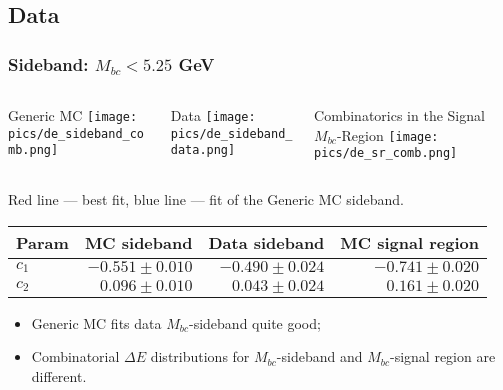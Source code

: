 \documentclass[10 pt,compress,mathserif]{beamer}
\begin{document}
\subsection{Data}
\begin{frame}
 \frametitle{Sideband: $M_{bc}<5.25$ GeV}
 \begin{tiny}
 \begin{columns}
  \begin{column}{0.33\textwidth}
  \begin{center}
  Generic MC
   \texttt{[image: pics/de\_sideband\_comb.png]}
   \end{center}
  \end{column}
  \begin{column}{0.33\textwidth}
  \begin{center}
  Data
   \texttt{[image: pics/de\_sideband\_data.png]}
   \end{center}
  \end{column}
  \begin{column}{0.33\textwidth}
  \begin{center}
  Combinatorics in the Signal $M_{bc}$-Region
   \texttt{[image: pics/de\_sr\_comb.png]}
   \end{center}
  \end{column}
 \end{columns}
 \begin{center}
  Red line --- best fit, blue line --- fit of the Generic MC sideband.
 \end{center}
\end{tiny}

\begin{small}
 \begin{table}[bt]
 \small
 \begin{tabular}{|l|r|r|r|} \hline
 Param &    MC sideband    & Data sideband & MC signal region \\ \hline
$c_1$  &$-0.551 \pm 0.010$ & $-0.490 \pm 0.024$ &$-0.741 \pm 0.020$ \\ \hline
$c_2$  &$ 0.096 \pm 0.010$ & $ 0.043 \pm 0.024$ &$ 0.161 \pm 0.020$ \\ \hline
 \end{tabular}
 \end{table}

 \begin{itemize}
  \item Generic MC fits data $M_{bc}$-sideband quite good;
  \item Combinatorial $\Delta E$ distributions for $M_{bc}$-sideband and $M_{bc}$-signal region are different.
 \end{itemize}
\end{small}
\end{frame}
\end{document}
